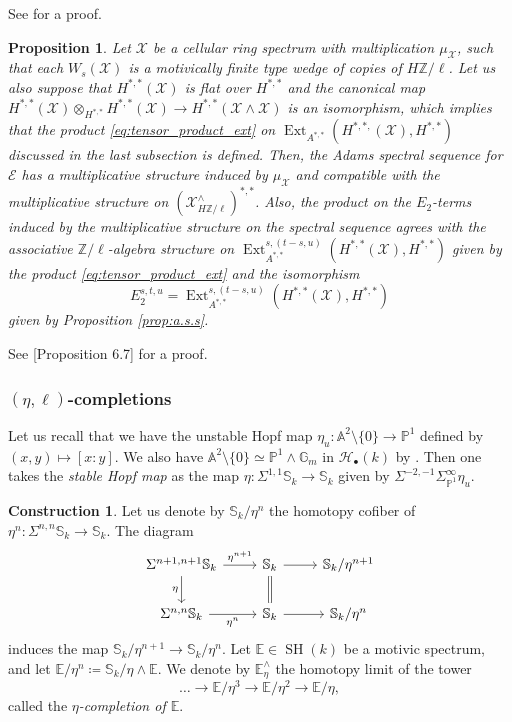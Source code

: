 \documentclass[10pt]{amsart}
\theoremstyle{definition}
\newtheorem{constr}[defn]{Construction}
\theoremstyle{plain}
\newtheorem{prop}[defn]{Proposition}
\numberwithin{equation}{section}
\newcommand{\0}{\emptyset}
\newcommand{\sE}{{\mathcal E}}
\newcommand{\sH}{{\mathcal H}}
\newcommand{\sX}{{\mathcal X}}
\newcommand{\A}{{\mathbb A}}
\newcommand{\E}{{\mathbb E}}
\newcommand{\G}{{\mathbb G}}
\renewcommand{\P}{{\mathbb P}}
\newcommand{\Z}{{\mathbb Z}}
\newcommand{\SH}{{\operatorname{SH}}}
\newcommand{\Ext}{{\operatorname{Ext}}}
\begin{document}
See \cite[Proposition 6.6]{lev:ellcoh} for a proof.

\begin{prop}
\label{prop:a.s.s.multiplication}
    Let $\sX$ be a cellular ring spectrum with multiplication $\mu_{\sX}$, such that each $W_s(\sX)$ is a motivically finite type wedge of copies of $H\Z/\ell$. Let us also suppose that 
    $H^{*,*}(\sX)$ is flat over $H^{*,*}$ and the canonical map $H^{*,*}(\sX)\otimes_{H^{*,*}}H^{*,*}(\sX) \to H^{*,*}(\sX \wedge \sX)$ is an isomorphism, which implies that the product \eqref{eq:tensor_product_ext} on $\Ext_{A^{*,*}}(H^{*,*,}(\sX),H^{*,*})$ discussed in the last subsection is defined. Then, the Adams spectral sequence for $\sE$ has a multiplicative structure induced by $\mu_\sX$ and compatible with the multiplicative structure on $(\sX_{H\Z/\ell}^\wedge)^{*,*}$. Also, the product on the $E_2$-terms induced by the multiplicative structure on the spectral sequence agrees with the associative $\Z/\ell$-algebra structure on $\Ext_{A^{*,*}}^{s,(t-s,u)}(H^{*,*}(\sX),H^{*,*})$ given by the product \eqref{eq:tensor_product_ext} and the isomorphism 
$$E_2^{s,t,u}= \Ext_{A^{*,*}}^{s,(t-s,u)}(H^{*,*}(\sX),H^{*,*})$$    
given by Proposition \ref{prop:a.s.s}.
\end{prop}

See [Proposition 6.7]\cite{lev:ellcoh} for a proof.

\subsubsection{$(\eta,\ell)$-completions}

Let us recall that we have the unstable Hopf map $\eta_u: \A^2 \setminus \{0\} \to \P^1$ defined by $(x,y) \mapsto [x:y]$. We also have $\A^2 \setminus \{0\}\simeq \P^1 \wedge \G_m$ in $\sH_\bullet(k)$ by \cite[\S 3 Example 2.20]{morvoe:homotopytheory}. Then one takes the \emph{stable Hopf map} as the map $\eta: \Sigma^{1,1}\mathbb{S}_k \to \mathbb{S}_k$ given by $\Sigma^{-2,-1}\Sigma^\infty_{\P^1}\eta_u$.

\begin{constr}
\label{constr:eta-completion}
    Let us denote by $\mathbb{S}_k/\eta^n$ the homotopy cofiber of $\eta^n:\Sigma^{n,n}\mathbb{S}_k \to \mathbb{S}_k$. The  diagram
    $$
    \begin{tikzcd}
       \Sigma^{n+1,n+1}\mathbb{S}_k \arrow[d, swap, "\eta"] \arrow[r, "\eta^{n+1}"] & \mathbb{S}_k \arrow[d, equal] \arrow[r] & \mathbb{S}_k/\eta^{n+1} \\
       \Sigma^{n,n}\mathbb{S}_k \arrow[r, swap, "\eta^{n}"] & \mathbb{S}_k \arrow[r] & \mathbb{S}_k/\eta^n
    \end{tikzcd}
    $$
    induces the map $\mathbb{S}_k/\eta^{n+1} \to \mathbb{S}_k/\eta^n$. Let $\E \in \SH(k)$ be a motivic spectrum, and let $\E/\eta^n \coloneqq \mathbb{S}_k/\eta \wedge \E$. We denote by $\E_\eta^\wedge$ the homotopy limit of the tower
    $$ \ldots \to \E/\eta^3 \to \E/\eta^2 \to \E/\eta,$$
    called the \emph{$\eta$-completion of $\E$}.
\end{constr}
\end{document}
